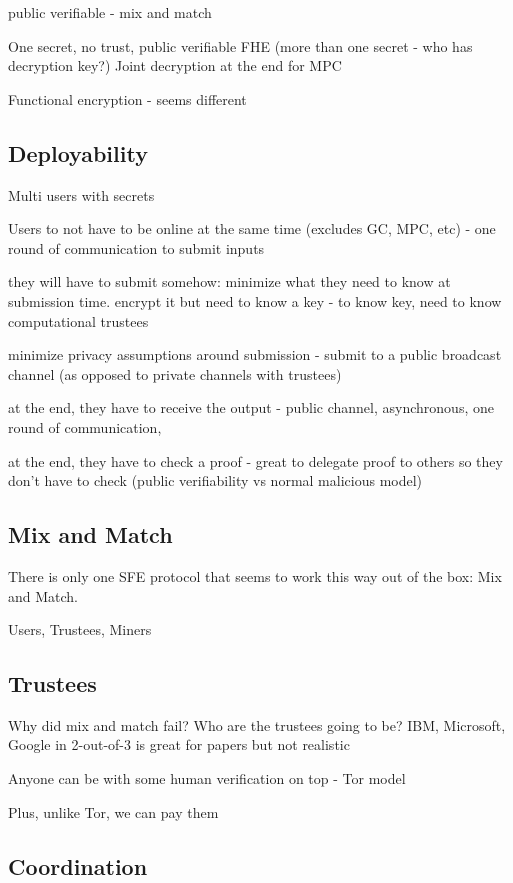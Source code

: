 public verifiable
- mix and match 

One secret, no trust, public verifiable 
FHE (more than one secret - who has decryption key?) 
Joint decryption at the end for MPC

Functional encryption
- seems different

\subsection{Deployability}

Multi users with secrets

Users to not have to be online at the same time (excludes GC, MPC, etc) - one round of communication to submit inputs

they will have to submit somehow: minimize what they need to know at submission time. encrypt it but need to know a key - to know key, need to know computational trustees

minimize privacy assumptions around submission - submit to a public broadcast channel (as opposed to private channels with trustees) 

at the end, they have to receive the output - public channel, asynchronous, one round of communication, 

at the end, they have to check a proof - great to delegate proof to others so they don't have to check (public verifiability vs normal malicious model)

\subsection{Mix and Match}

There is only one SFE protocol that seems to work this way out of the box: Mix and Match.

Users, Trustees, Miners

\subsection{Trustees}

Why did mix and match fail? Who are the trustees going to be? IBM, Microsoft, Google in 2-out-of-3 is great for papers but not realistic 

Anyone can be with some human verification on top - Tor model 

Plus, unlike Tor, we can pay them

\subsection{Coordination}

